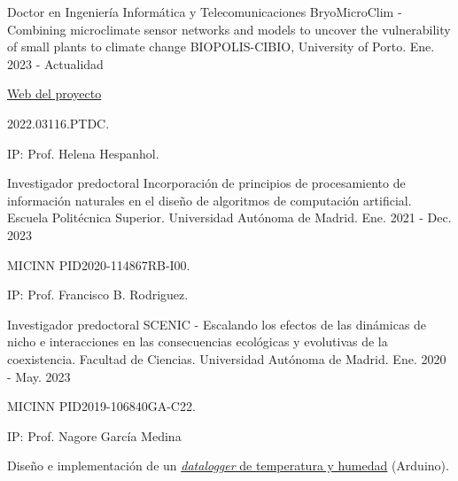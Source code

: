 
\begin{cventries}


  \cventry
    {Doctor en Ingeniería Informática y Telecomunicaciones} %
    {BryoMicroClim - Combining microclimate sensor networks and models to uncover the
vulnerability of small plants to climate change} %
    {BIOPOLIS-CIBIO, University of Porto.} %
    {Ene. 2023 - Actualidad} %
    {
      \begin{cvitems} %
      	\item {\href{https://bryomicroclim.net/en/}{Web del proyecto}}
        \item {2022.03116.PTDC.}
        \item {IP: Prof. Helena Hespanhol.}
      \end{cvitems}
    }

  \cventry
    {Investigador predoctoral} %
    {Incorporación de principios de procesamiento de información naturales en el diseño de algoritmos de computación artificial.} %
    {Escuela Politécnica Superior. Universidad Autónoma de Madrid.} %
    {Ene. 2021 - Dec. 2023} %
    {
      \begin{cvitems} %
        \item {MICINN PID2020-114867RB-I00.}
        \item {IP: Prof. Francisco B. Rodriguez.}
      \end{cvitems}
    }

  \cventry
    {Investigador predoctoral} %
    {SCENIC - Escalando los efectos de las dinámicas de nicho e interacciones en las consecuencias ecológicas y evolutivas de la coexistencia.} %
    {Facultad de Ciencias. Universidad Autónoma de Madrid.} %
    {Ene. 2020 - May. 2023} %
    {
      \begin{cvitems} %
        \item {MICINN PID2019-106840GA-C22.}
        \item {IP: Prof. Nagore García Medina}
        \item {Diseño e implementación de un \underline{\href{https://github.com/united-ecology/btmboard}{\textit{datalogger} de temperatura y humedad}} (Arduino).}
      \end{cvitems}
    }


\end{cventries}
